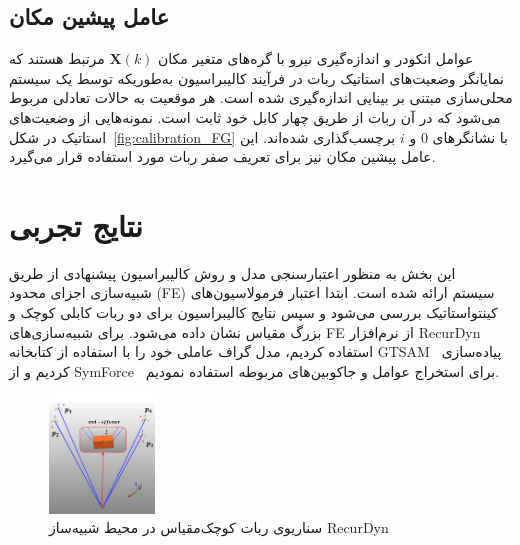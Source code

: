 \subsection{عامل پیشین مکان}
عوامل انکودر و اندازه‌گیری نیرو با گره‌های متغیر مکان $\bm{X}(k)$ مرتبط هستند که نمایانگر وضعیت‌های استاتیک ربات در فرآیند کالیبراسیون به‌طوریکه توسط یک سیستم محلی‌سازی مبتنی بر بینایی اندازه‌گیری شده است. 
هر موقعیت به حالات تعادلی مربوط می‌شود که در آن ربات از طریق چهار کابل خود ثابت است. نمونه‌هایی از وضعیت‌های استاتیک در شکل~\ref{fig:calibration_FG} با نشانگرهای $0$ و $i$ برچسب‌گذاری شده‌اند. این عامل پیشین  مکان نیز برای تعریف صفر ربات مورد استفاده قرار می‌گیرد.

























\section{نتایج تجربی} \label{sec:results}
این بخش به منظور اعتبارسنجی مدل و روش کالیبراسیون پیشنهادی از طریق شبیه‌سازی اجزای محدود (FE) سیستم ارائه شده است. ابتدا اعتبار فرمولاسیون‌های کینتواستاتیک بررسی می‌شود و سپس نتایج کالیبراسیون برای دو ربات کابلی کوچک و بزرگ مقیاس نشان داده می‌شود. برای شبیه‌سازی‌های FE از نرم‌افزار RecurDyn~\cite{functionbay} استفاده کردیم، مدل گراف عاملی خود را با استفاده از کتابخانه GTSAM~\cite{dellaert2012factor} پیاده‌سازی کردیم و از SymForce~\cite{Martiros-RSS-22} برای استخراج عوامل و جاکوبین‌های مربوطه استفاده نمودیم.

\begin{figure} [t]
	\centering
	\includegraphics[width=0.25\textwidth]{img/E2_small.pdf}
	\caption{سناریوی ربات کوچک‌مقیاس در محیط شبیه‌ساز RecurDyn}
	\label{fig:recurdyn_small}
\end{figure}

